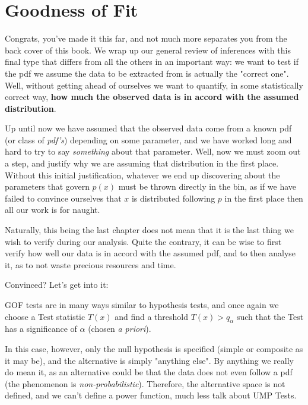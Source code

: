 \chapter{Goodness of Fit}

Congrats, you've made it this far, and not much more separates you from the back cover of this book. We wrap up our general review of inferences with this final type that differs from all the others in an important way: we want to test if the pdf we assume the data to be extracted from is actually the "correct one". Well, without getting ahead of ourselves we want to quantify, in some statistically correct way, \textbf{how much the observed data is in accord with the assumed distribution}. 

Up until now we have assumed that the observed data come from a known pdf (or class of \emph{pdf's}) depending on some parameter, and we have worked long and hard to try to say \emph{something} about that parameter. Well, now we must zoom out a step, and justify why we are assuming that distribution in the first place. Without this initial justification, whatever we end up discovering about the parameters that govern $p(x)$ must be thrown directly in the bin, as if we have failed to convince ourselves that $x$ is distributed following $p$ in the first place then all our work is for naught.

Naturally, this being the last chapter does not mean that it is the last thing we wish to verify during our analysis. Quite the contrary, it can be wise to first verify how well our data is in accord with the assumed pdf, and to then analyse it, as to not waste precious resources and time.

Convinced? Let's get into it:

GOF tests are in many ways similar to hypothesis tests, and once again we choose a Test statistic $T(x)$ and find a threshold $T(x)>q_\alpha$ such that the Test has a significance of $\alpha$ (chosen \emph{a priori}).

In this case, however, only the null hypothesis is specified (simple or composite as it may be), and the alternative is simply "anything else". By anything we really do mean it, as an alternative could be that the data does not even follow a pdf (the phenomenon is \emph{non-probabilistic}). Therefore, the alternative space is not defined, and we can't define a power function, much less talk about UMP Tests.

